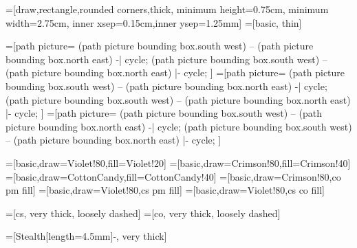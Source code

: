 \documentclass[12pt]{article}
\begin{document}
=[draw,rectangle,rounded corners,thick, minimum height=0.75cm, minimum width=2.75cm, inner xsep=0.15cm,inner ysep=1.25mm]
=[basic, thin]

\newcommand\HalfFill[2] {
    \fill[#1] (path picture bounding box.south west)
    -- (path picture bounding box.north east) -| cycle;
    \fill[#2] (path picture bounding box.south west)
    -- (path picture bounding box.north east) |- cycle;
}

=[path picture={\HalfFill{CottonCandy!40}{Crimson!40}}]
=[path picture={\HalfFill{Violet!20}{CottonCandy!40}}]
=[path picture={\HalfFill{Violet!20}{Crimson!40}}]

=[basic,draw=Violet!80,fill=Violet!20]
=[basic,draw=Crimson!80,fill=Crimson!40]
=[basic,draw=CottonCandy,fill=CottonCandy!40]
=[basic,draw=Crimson!80,co pm fill]
=[basic,draw=Violet!80,cs pm fill]
=[basic,draw=Violet!80,cs co fill]

=[cs, very thick, loosely dashed]
=[co, very thick, loosely dashed]

=[{Stealth[length=4.5mm]}-, very thick]

\newcommand\DrawCourses[2][3 cm] {
    \foreach \title/\style in {#2} {
        \node (\title) [\style, right=#1 of last, alias=last] {\title};
    }
}
\end{document}
